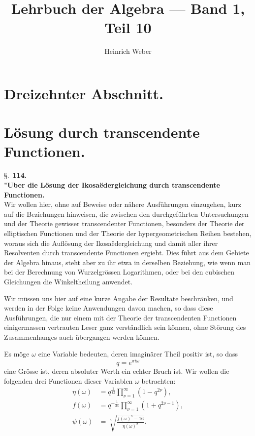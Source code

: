 \documentclass[12pt,a4paper]{article}
\title{Lehrbuch der Algebra --- Band 1, Teil 10}
\author{Heinrich Weber}
\date{}
\begin{document}
\maketitle
\thispagestyle{empty}


\section*{Dreizehnter Abschnitt.}

\section{L\"osung durch transcendente Functionen.}
\label{sec:114}

\noindent\S.~\textbf{114.}\\[0.5em]
\textbf{"Uber die L\"osung der Ikosa\"edergleichung durch transcendente Functionen.}\\[0.5em]

Wir wollen hier, ohne auf Beweise oder n\"ahere Ausf\"uhrungen einzugehen, kurz auf die Beziehungen hinweisen, die zwischen den durchgef\"uhrten Untersuchungen und der Theorie gewisser transcendenter Functionen, besonders der Theorie der elliptischen Functionen und der Theorie der hypergeometrischen Reihen bestehen, woraus sich die Aufl\"osung der Ikosa\"edergleichung und damit aller ihrer Resolventen durch transcendente Functionen ergiebt. Dies f\"uhrt aus dem Gebiete der Algebra hinaus, steht aber zu ihr etwa in derselben Beziehung, wie wenn man bei der Berechnung von Wurzelgr\"ossen Logarithmen, oder bei den cubischen Gleichungen die Winkeltheilung anwendet.

Wir m\"ussen uns hier auf eine kurze Angabe der Resultate beschr\"anken, und werden in der Folge keine Anwendungen davon machen, so dass diese Ausf\"uhrungen, die nur einem mit der Theorie der transcendenten Functionen einigermassen vertrauten Leser ganz verst\"andlich sein k\"onnen, ohne St\"orung des Zusammenhanges auch \"ubergangen werden k\"onnen.

Es m\"oge $\omega$ eine Variable bedeuten, deren imagin\"arer Theil positiv ist, so dass
\[
q = e^{\pi i \omega}
\]
eine Gr\"osse ist, deren absoluter Werth ein echter Bruch ist. Wir wollen die folgenden drei Functionen dieser Variablen $\omega$ betrachten:
\begin{align}
\label{eq:eta} \eta(\omega) &= q^{\frac{1}{12}} \prod_{\nu=1}^{\infty}(1-q^{2\nu}),\\
\label{eq:f1} f(\omega) &= q^{-\frac{1}{24}} \prod_{\nu=1}^{\infty}(1+q^{2\nu-1}),\\
\label{eq:psi} \psi(\omega) &= \sqrt[8]{\frac{f(\omega)^8 - 16}{\eta(\omega)^8}}.
\end{align}
\end{document}
